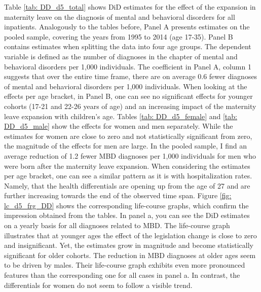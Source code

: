 \documentclass[11pt, a4paper]{article} %
\begin{document}
Table \ref{tab: DD_d5_total} shows DiD estimates for the effect of the expansion in maternity leave on the diagnosis of mental and behavioral disorders for all inpatients. Analogously to the tables before, Panel A presents estimates on the pooled sample, covering the years from 1995 to 2014 (age 17-35). Panel B contains estimates when splitting the data into four age groups. The dependent variable is defined as the number of diagnoses in the chapter of mental and behavioral disorders per 1,000 individuals. The coefficient in Panel A, column 1 suggests that over the entire time frame, there are on average 0.6 fewer diagnoses of mental and behavioral disorders per 1,000 individuals. When looking at the effects per age bracket, in Panel B, one can see no significant effects for younger cohorts (17-21 and 22-26 years of age) and an increasing impact of the maternity leave expansion with children's age. Tables \ref{tab: DD_d5_female} and \ref{tab: DD_d5_male} show the effects for women and men separately. While the estimates for women are close to zero and not statistically significant from zero, the magnitude of the effects for men are large. In the pooled sample, I find an average reduction of 1.2 fewer MBD diagnoses per 1,000 individuals for men who were born after the maternity leave expansion. When considering the estimates per age bracket, one can see a similar pattern as it is with hospitalization rates. Namely, that the health differentials are opening up from the age of 27 and are further increasing towards the end of the observed time span. Figure \ref{fig: lc_d5_frg_DD} shows the corresponding life-course graphs, which confirm the impression obtained from the tables. In panel a, you can see the DiD estimates on a yearly basis for all diagnoses related to MBD. The life-course graph illustrates that at younger ages the effect of the legislation change is close to zero and insignificant. Yet, the estimates grow in magnitude and become statistically significant for older cohorts. The reduction in MBD diagnoses at older ages seem to be driven by males. Their life-course graph exhibits even more pronounced features than the corresponding one for all cases in panel a. In contrast, the differentials for women do not seem to follow a visible trend. \newline
\end{document}

